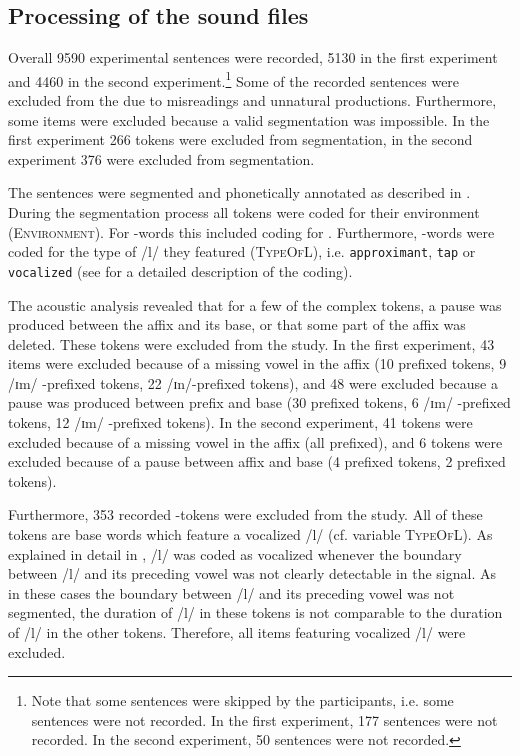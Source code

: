 \subsection{Processing of the sound files}

Overall 9590 experimental sentences were recorded, 5130 in the first experiment and 4460 in the second experiment.\footnote{Note that some sentences were skipped by the participants, i.e. some sentences were not recorded. In the first experiment, 177 sentences were not recorded. In the second experiment, 50 sentences were not recorded. } 
Some of the recorded sentences were excluded from the  due to misreadings and unnatural productions. Furthermore, some items  were excluded because a valid segmentation was impossible. In the first experiment 266 tokens were excluded from segmentation, in the second experiment 376 were excluded from segmentation.



The sentences were segmented and phonetically annotated as described in . 
During the segmentation process all tokens were coded for their environment (\textsc{Environment}). For -words this included coding for . Furthermore, -words were coded for the type of /l/ they featured (\textsc{TypeOfL}), i.e. \texttt{approximant}, \texttt{tap} or \texttt{vocalized} (see  for a detailed description of the coding).


 The acoustic analysis revealed that for a few of the complex tokens, a pause was produced between the affix and its base, or that some part of the affix was deleted. These tokens were excluded from the study. 
 In the first experiment, 43 items were excluded because of a missing vowel in the affix  (10  prefixed tokens,  9 /ɪm/ -prefixed tokens, 22 /ɪn/-prefixed tokens), and 48 were excluded because a pause was produced between prefix and base (30  prefixed tokens,  6 /ɪm/ -prefixed tokens, 12 /ɪm/ -prefixed tokens). 
 In the second experiment, 41 tokens were excluded because of a missing vowel in the affix (all prefixed), and 6 tokens were excluded because of a pause between affix and base (4 prefixed tokens, 2 prefixed tokens). %


Furthermore, 353 recorded -tokens were excluded from the study. %
All of these tokens are base words which feature a vocalized /l/ (cf. variable \textsc{TypeOfL}). As explained in detail in , /l/ was coded as vocalized whenever the boundary between /l/ and its preceding vowel was not clearly detectable in the signal. As in these cases the boundary between /l/ and its preceding vowel was not segmented, 
the duration of /l/ in these tokens is not comparable to the duration of /l/ in the other tokens. Therefore, all items featuring vocalized /l/ were excluded.



